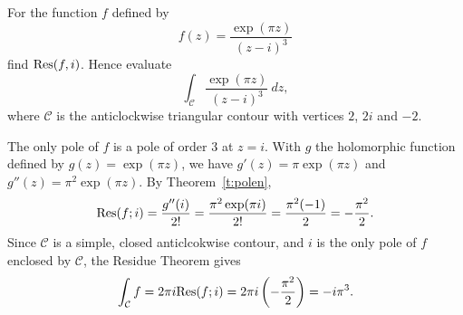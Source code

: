 \begin{example}
For the function $f$ defined by
\[
f(z) = \frac{\exp(\pi z)}{(z-i)^3}
\]
find $\mathrm{Res} (f,i)$.  Hence evaluate
\[
\int_{\mathcal{C}} \frac{\exp( \pi z)}{(z-i)^3}\ dz,
\]
where $\mathcal{C}$ is the anticlockwise triangular contour with vertices $2$, $2i$ and $-2$.

The only pole of $f$ is a pole of order $3$ at $z=i$.  With $g$ the holomorphic function defined by $g(z) = \exp(\pi z )$, we have $g'(z) = \pi \exp(\pi z)$ and $g''(z) = \pi^2 \exp(\pi z)$.  By Theorem~\ref{t:polen},
\[
\mathrm{Res}(f;i) = \frac{g''(i)}{2!} = \frac{\pi^2 \exp(\pi i)}{2!} = \frac{\pi^2(-1)}{2} = - \frac{\pi^2}{2}.
\]
Since $\mathcal{C}$ is a simple, closed anticlcokwise contour, and $i$ is the only pole of $f$ enclosed by $\mathcal{C}$, the Residue Theorem gives
\[
\int_{\mathcal{C}} f = 2\pi i \mathrm{Res} (f;i) = 2\pi i \left( -\frac{\pi^2}{2} \right) = -i \pi^3.
\]
\end{example}

